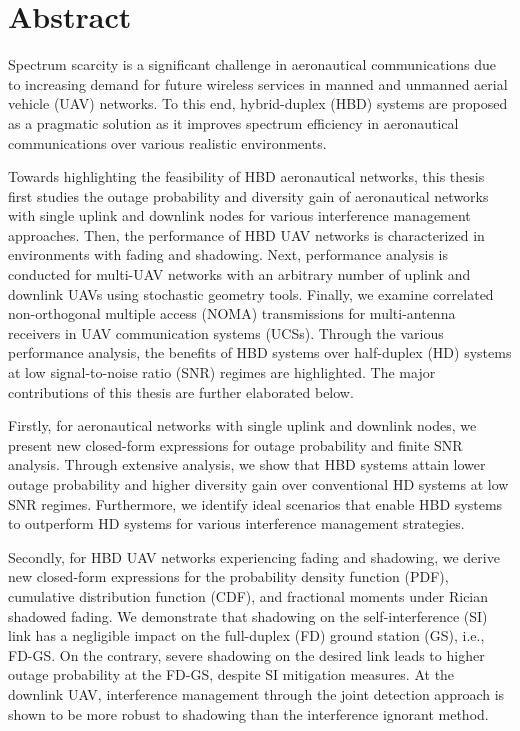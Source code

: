 \chapter* {Abstract}

Spectrum scarcity is a significant challenge in aeronautical communications due to increasing demand for future wireless services in manned and unmanned aerial vehicle (UAV) networks. To this end, hybrid-duplex (HBD) systems are proposed as a pragmatic solution as it improves spectrum efficiency in aeronautical communications over various realistic environments.

Towards highlighting the feasibility of HBD aeronautical networks, this thesis first studies the outage probability and diversity gain of aeronautical networks with single uplink and downlink nodes for various interference management approaches. Then, the performance of HBD UAV networks is characterized in environments with fading and shadowing. Next, performance analysis is conducted for multi-UAV networks with an arbitrary number of uplink and downlink UAVs using stochastic geometry tools. Finally, we examine correlated non-orthogonal multiple access (NOMA) transmissions for multi-antenna receivers in UAV communication systems (UCSs). Through the various performance analysis, the benefits of HBD systems over half-duplex (HD) systems at low signal-to-noise ratio (SNR) regimes are highlighted. The major contributions of this thesis are further elaborated below. 

Firstly, for aeronautical networks with single uplink and downlink nodes, we present new closed-form expressions for outage probability and finite SNR analysis. Through extensive analysis, we show that HBD systems attain lower outage probability and higher diversity gain over conventional HD systems at low SNR regimes. Furthermore, we identify ideal scenarios that enable HBD systems to outperform HD systems for various interference management strategies.

Secondly, for HBD UAV networks experiencing fading and shadowing, we derive new closed-form expressions for the probability density function (PDF), cumulative distribution function (CDF), and fractional moments under Rician shadowed fading. We demonstrate that shadowing on the self-interference (SI) link has a negligible impact on the full-duplex (FD) ground station (GS), i.e., FD-GS. On the contrary, severe shadowing on the desired link leads to higher outage probability at the FD-GS, despite SI mitigation measures. At the downlink UAV, interference management through the joint detection approach is shown to be more robust to shadowing than the interference ignorant method.

